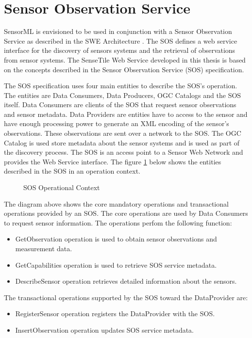 \documentclass[]{final_report}
\begin{document}
\section{Sensor Observation Service}
SensorML is envisioned to be used in conjunction with a Sensor Observation Service as described in the SWE Architecture \cite{SOSref}. The SOS defines a web service interface for the discovery of sensors systems and the retrieval of observations from sensor systems.  The SenseTile Web Service developed in this thesis is based on the concepts described in the Sensor Observation Service (SOS) specification.

The SOS specification uses four main entities to describe the SOS's operation. The entities are Data Consumers, Data Producers, OGC Catalogs and the SOS itself. Data Consumers are clients of the SOS that request sensor observations and sensor metadata. Data Providers are entities have to access to the sensor and have enough processing power to generate an XML encoding of the sensor's observations. These observations are sent over a network to the SOS. The OGC Catalog is used store metadata about the sensor systems and is used as part of the discovery process. The SOS is an access point to a Sensor Web Network and provides the Web Service interface. The figure \ref{fig:SOSoperationContext} below shows the entities described in the SOS in an operation context.
\begin{figure}[h]
\caption{SOS Operational Context}\label{fig:SOSoperationContext}
\end{figure}

The diagram above shows the core mandatory operations and transactional operations provided by an SOS. The core operations are used by Data Consumers to request sensor information. The operations perfom the following function:
 \begin{itemize}
\item GetObservation operation is used to obtain sensor observations and measurement data.
\item GetCapabilities operation is used to retrieve SOS service metadata.
\item DescribeSensor operation retrieves detailed information about the sensors.
\end{itemize}

The transactional operations supported by the SOS toward the DataProvider are:
 \begin{itemize}
\item RegisterSensor operation registers the DataProvider with the SOS.
\item InsertObservation operation updates SOS service metadata.
\end{itemize}
\end{document}
